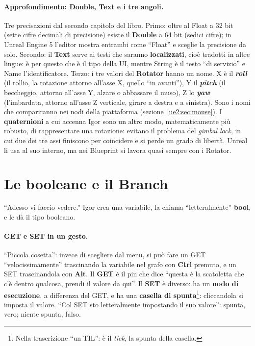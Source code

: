 \paragraph{Approfondimento: Double, Text e i tre angoli.} Tre precisazioni dal secondo
capitolo del libro. Primo: oltre al Float a 32 bit (sette cifre decimali di
precisione) esiste il \textbf{Double} a 64 bit (sedici cifre); in Unreal Engine 5 l'editor
mostra entrambi come ``Float'' e sceglie la precisione da solo. Secondo: il
\textbf{Text} serve ai testi che saranno \textbf{localizzati}, cioè tradotti in altre
lingue: è per questo che è il tipo della UI, mentre String è il testo ``di servizio'' e
Name l'identificatore. Terzo: i tre valori del \textbf{Rotator} hanno un nome. X è il
\textbf{\emph{roll}} (il rollio, la rotazione attorno all'asse X, quello ``in avanti''),
Y il \textbf{\emph{pitch}} (il beccheggio, attorno all'asse Y, alzare o abbassare il
muso), Z lo \textbf{\emph{yaw}} (l'imbardata, attorno all'asse Z verticale, girare a
destra e a sinistra). Sono i nomi che compariranno nei nodi della piattaforma
(sezione~\ref{ue2:sec:mouse}). I \textbf{quaternioni} a cui accenna Igor sono un altro
modo, matematicamente più robusto, di rappresentare una rotazione: evitano il problema
del \emph{gimbal lock}, in cui due dei tre assi finiscono per coincidere e si perde un
grado di libertà. Unreal li usa al suo interno, ma nei Blueprint si lavora quasi sempre
con i Rotator.

\section{Le booleane e il Branch}
\label{ue2:sec:branch}

``Adesso vi faccio vedere.'' Igor crea una variabile, la chiama ``letteralmente''
\textbf{bool}, e le dà il tipo booleano.

\paragraph{GET e SET in un gesto.} ``Piccola cosetta'': invece di scegliere dal menu, si
può fare un GET ``velocissimamente'' trascinando la variabile nel grafo con
\textbf{Ctrl} premuto, e un SET trascinandola con \textbf{Alt}. Il \textbf{GET} è il pin
che dice ``questa è la scatoletta che c'è dentro qualcosa, prendi il valore da qui''. Il
\textbf{SET} è diverso: ha un \textbf{nodo di esecuzione}, a differenza del GET, e ha una
\textbf{casella di spunta}\footnote{Nella trascrizione ``un TIL'': è il \emph{tick},
la spunta della casella.}: cliccandola si imposta il valore. ``Col SET sto letteralmente
impostando il suo valore'': spunta, vero; niente spunta, falso.

